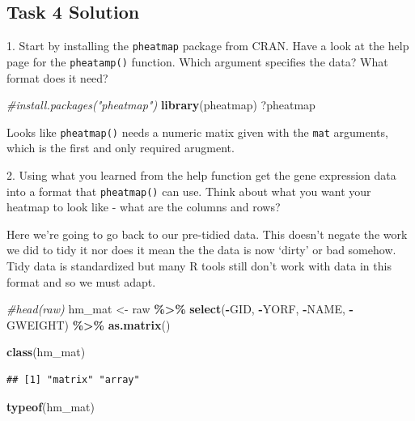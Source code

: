 \documentclass[
]{book}
\newenvironment{Shaded}{\begin{snugshade}}{\end{snugshade}}
\newcommand{\CommentTok}[1]{\textcolor[rgb]{0.56,0.35,0.01}{\textit{#1}}}
\newcommand{\FunctionTok}[1]{\textcolor[rgb]{0.13,0.29,0.53}{\textbf{#1}}}
\newcommand{\NormalTok}[1]{#1}
\newcommand{\OtherTok}[1]{\textcolor[rgb]{0.56,0.35,0.01}{#1}}
\newcommand{\SpecialCharTok}[1]{\textcolor[rgb]{0.81,0.36,0.00}{\textbf{#1}}}
\begin{document}
\subsection*{Task 4 Solution}\label{task-4-solution}

1. Start by installing the \texttt{pheatmap} package from CRAN. Have a look at the help page for the \texttt{pheatamp()} function. Which argument specifies the data? What format does it need?

\begin{Shaded}
\begin{Highlighting}[]
\CommentTok{\#install.packages("pheatmap")}
\FunctionTok{library}\NormalTok{(pheatmap)}
\NormalTok{?pheatmap}
\end{Highlighting}
\end{Shaded}

Looks like \texttt{pheatmap()} needs a numeric matix given with the \texttt{mat} arguments, which is the first and only required arugment.

2. Using what you learned from the help function get the gene expression data into a format that \texttt{pheatmap()} can use. Think about what you want your heatmap to look like - what are the columns and rows?

Here we're going to go back to our pre-tidied data. This doesn't negate the work we did to tidy it nor does it mean the the data is now `dirty' or bad somehow. Tidy data is standardized but many R tools still don't work with data in this format and so we must adapt.

\begin{Shaded}
\begin{Highlighting}[]
\CommentTok{\#head(raw)}
\NormalTok{hm\_mat }\OtherTok{\textless{}{-}}\NormalTok{ raw }\SpecialCharTok{\%\textgreater{}\%}
  \FunctionTok{select}\NormalTok{(}\SpecialCharTok{{-}}\NormalTok{GID, }\SpecialCharTok{{-}}\NormalTok{YORF, }\SpecialCharTok{{-}}\NormalTok{NAME, }\SpecialCharTok{{-}}\NormalTok{GWEIGHT) }\SpecialCharTok{\%\textgreater{}\%}
  \FunctionTok{as.matrix}\NormalTok{()}

\FunctionTok{class}\NormalTok{(hm\_mat)}
\end{Highlighting}
\end{Shaded}

\begin{verbatim}
## [1] "matrix" "array"
\end{verbatim}

\begin{Shaded}
\begin{Highlighting}[]
\FunctionTok{typeof}\NormalTok{(hm\_mat)}
\end{Highlighting}
\end{Shaded}
\end{document}
